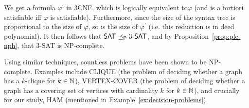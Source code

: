 \begin{example}
    We get a formula \(\varphi^\prime\) in 3CNF, which is logically equivalent to\(\varphi\) (and is a fortiori satisfiable iff \(\varphi\) is satisfiable). Furthermore, since the size of the syntax tree is proportional to the size of \(\varphi\), so is the size of \(\varphi^\prime\) (i.e. this reduction is in deed polynomial). It then follows that
    \(\textsf{SAT} \preceq_\textsf{P} 3\textsf{-SAT}\), and by Proposition~\ref{prop:ple-nph}, that 3-\textsf{SAT} is \textsf{NP}-complete.
    

  
\end{example}

Using similar techniques, countless problems have been shown to be \textsf{NP}-complete. Examples include \textsf{CLIQUE} (the problem of deciding whether a graph has a \(k\)-clique for \(k\in\mathbb{N}\)),  \textsf{VERTEX-COVER} (the problem of deciding whether a graph has a covering set of vertices with cardinality \(k\) for \(k\in\mathbb{N}\)), and crucially for our study, \textsf{HAM} (mentioned in Example~\ref{ex:decision-problems}).

